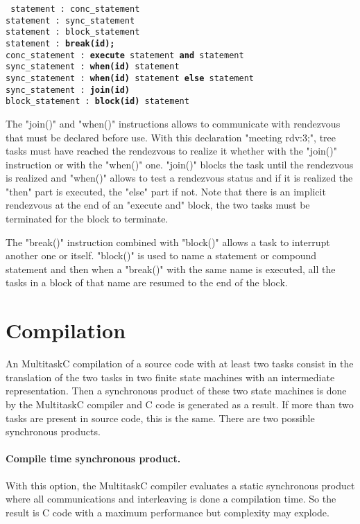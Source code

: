 \documentclass[10pt]{report}
\begin{document}
\begin{table}[h!]
\tt
\footnotesize
statement : conc\_statement\\
statement : sync\_statement\\
statement : block\_statement\\
statement : {\bf break(id);}\\
conc\_statement : {\bf execute} statement {\bf and} statement\\
sync\_statement : {\bf when(id)} statement\\
sync\_statement : {\bf when(id)} statement {\bf else} statement\\
sync\_statement : {\bf join(id)}\\
block\_statement : {\bf block(id)} statement\\
\end{table}

The "join()" and "when()" instructions allows to communicate with rendezvous that must be declared before use.
With this declaration "meeting rdv:3;", tree tasks must have reached the rendezvous to realize it whether with
the "join()" instruction or with the "when()" one. "join()" blocks the task until the rendezvous is realized and
"when()" allows to test a rendezvous status and if it is realized the "then" part is executed, the "else" part
if not. Note that there is an implicit rendezvous at the end of an "execute and" block, the two tasks must
be terminated for the block to terminate.

The "break()" instruction combined with "block()" allows a task to interrupt another one or itself. "block()"
is used to name a statement or compound statement and then when a "break()" with the same name is executed,
all the tasks in a block of that name are resumed to the end of the block.

\section{Compilation}

An MultitaskC compilation of a source code with at least two tasks consist in the translation of the two
tasks in two finite state machines with an intermediate representation. Then a synchronous product
of these two state machines is done by the MultitaskC compiler and C code is generated as a result.
If more than two tasks are present in source code, this is the same. There are two possible
synchronous products.

\paragraph{Compile time synchronous product.} With this option, the MultitaskC compiler evaluates a static
synchronous product where all communications and interleaving is done a compilation time. So the result is
C code with a maximum performance but complexity may explode.
\end{document}
